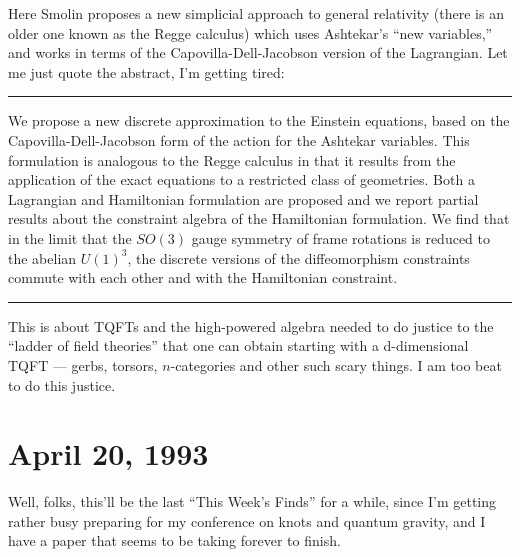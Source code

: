 \documentclass{article}
\def\tightlist{}
\renewcommand{\texttt}[1]{%
  \begingroup
  \ttfamily
  \begingroup\lccode`~=`/\lowercase{\endgroup\def~}{/\discretionary{}{}{}}%
  \begingroup\lccode`~=`[\lowercase{\endgroup\def~}{[\discretionary{}{}{}}%
  \begingroup\lccode`~=`.\lowercase{\endgroup\def~}{.\discretionary{}{}{}}%
  \catcode`/=\active\catcode`[=\active\catcode`.=\active
  \scantokens{#1\noexpand}%
  \endgroup
}
\begin{document}
Here Smolin proposes a new simplicial approach to general relativity
(there is an older one known as the Regge calculus) which uses
Ashtekar's ``new variables,'' and works in terms of the
Capovilla-Dell-Jacobson version of the Lagrangian. Let me just quote the
abstract, I'm getting tired:

\begin{center}\rule{0.5\linewidth}{0.5pt}\end{center}

We propose a new discrete approximation to the Einstein equations, based
on the Capovilla-Dell-Jacobson form of the action for the Ashtekar
variables. This formulation is analogous to the Regge calculus in that
it results from the application of the exact equations to a restricted
class of geometries. Both a Lagrangian and Hamiltonian formulation are
proposed and we report partial results about the constraint algebra of
the Hamiltonian formulation. We find that in the limit that the
\(SO(3)\) gauge symmetry of frame rotations is reduced to the abelian
\(U(1)^3\), the discrete versions of the diffeomorphism constraints
commute with each other and with the Hamiltonian constraint.

\begin{center}\rule{0.5\linewidth}{0.5pt}\end{center}


This is about TQFTs and the high-powered algebra needed to do justice to
the ``ladder of field theories'' that one can obtain starting with a
d-dimensional TQFT --- gerbs, torsors, \(n\)-categories and other such
scary things. I am too beat to do this justice.
\hypertarget{week13}{%
\section{April 20, 1993}\label{week13}}

Well, folks, this'll be the last ``This Week's Finds'' for a while,
since I'm getting rather busy preparing for my conference on knots and
quantum gravity, and I have a paper that seems to be taking forever to
finish.
\end{document}
